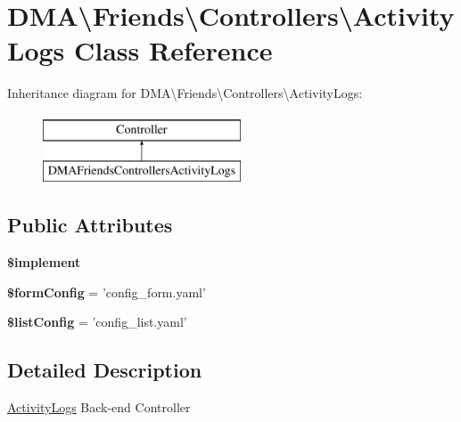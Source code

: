\hypertarget{classDMA_1_1Friends_1_1Controllers_1_1ActivityLogs}{\section{D\-M\-A\textbackslash{}Friends\textbackslash{}Controllers\textbackslash{}Activity\-Logs Class Reference}
\label{classDMA_1_1Friends_1_1Controllers_1_1ActivityLogs}
}
Inheritance diagram for D\-M\-A\textbackslash{}Friends\textbackslash{}Controllers\textbackslash{}Activity\-Logs\-:\begin{figure}[H]
\begin{center}
\leavevmode
\includegraphics[height=2.000000cm]{d4/d23/classDMA_1_1Friends_1_1Controllers_1_1ActivityLogs}
\end{center}
\end{figure}
\subsection*{Public Attributes}
\begin{DoxyCompactItemize}
\item 
{\bfseries \$implement}
\item 
\hypertarget{classDMA_1_1Friends_1_1Controllers_1_1ActivityLogs_a2b07b2999d34d646303a3d70ade2da0a}{{\bfseries \$form\-Config} = 'config\-\_\-form.\-yaml'}\label{classDMA_1_1Friends_1_1Controllers_1_1ActivityLogs_a2b07b2999d34d646303a3d70ade2da0a}

\item 
\hypertarget{classDMA_1_1Friends_1_1Controllers_1_1ActivityLogs_a4f2d381656dbf1241a60f5b404a6230b}{{\bfseries \$list\-Config} = 'config\-\_\-list.\-yaml'}\label{classDMA_1_1Friends_1_1Controllers_1_1ActivityLogs_a4f2d381656dbf1241a60f5b404a6230b}

\end{DoxyCompactItemize}


\subsection{Detailed Description}
\hyperlink{classDMA_1_1Friends_1_1Controllers_1_1ActivityLogs}{Activity\-Logs} Back-\/end Controller 

